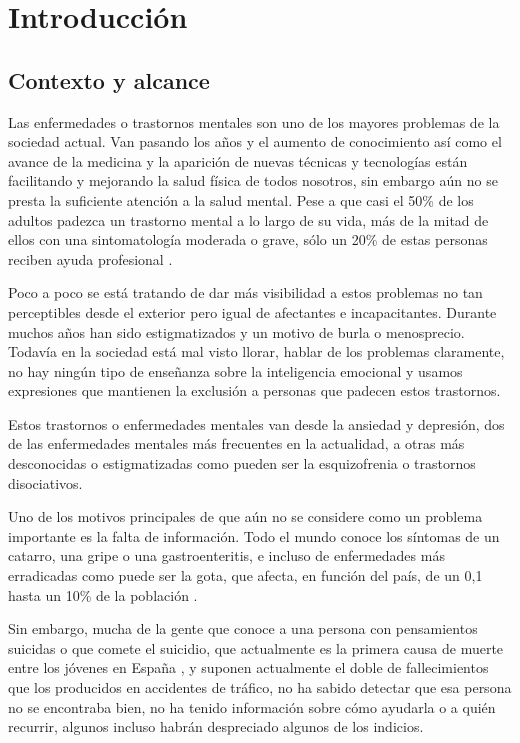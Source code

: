 \documentclass[12pt, a4paper,twoside,titlepage]{book}
\begin{document}
\chapter{Introducción}


\section{Contexto y alcance}

Las enfermedades o trastornos mentales son uno de los mayores problemas de la sociedad actual. Van pasando los años y el aumento de conocimiento así como el avance de la medicina y la aparición de nuevas técnicas y tecnologías están facilitando y mejorando la salud física de todos nosotros, sin embargo aún no se presta la suficiente atención a la salud mental. Pese a que casi el 50\% de los adultos padezca un trastorno mental a lo largo de su vida, más de la mitad de ellos con una sintomatología moderada o grave, sólo un 20\% de estas personas reciben ayuda profesional \cite{articuloIntro1}. 

Poco a poco se está tratando de dar más visibilidad a estos problemas no tan perceptibles desde el exterior pero igual de afectantes e incapacitantes. Durante muchos años han sido estigmatizados y un motivo de burla o menosprecio. Todavía en la sociedad está mal visto llorar, hablar de los problemas claramente, no hay ningún tipo de enseñanza sobre la inteligencia emocional y usamos expresiones que mantienen la exclusión a personas que padecen estos trastornos.  

Estos trastornos o enfermedades mentales van desde la ansiedad y depresión, dos de las enfermedades mentales más frecuentes en la actualidad, a otras más desconocidas o estigmatizadas como pueden ser la esquizofrenia o trastornos disociativos. 

Uno de los motivos principales de que aún no se considere como un problema importante es la falta de información. Todo el mundo conoce los síntomas de un catarro, una gripe o una gastroenteritis, e incluso de enfermedades más erradicadas como puede ser la gota, que afecta, en función del país, de un 0,1 hasta un 10\% de la población \cite{articuloIntro2}. 

Sin embargo, mucha de la gente que conoce a una persona con pensamientos suicidas o que comete el suicidio, que actualmente es la primera causa de muerte entre los jóvenes en España \cite{fundacionSuicidio}, y suponen actualmente el doble de fallecimientos que los producidos en accidentes de tráfico, no ha sabido detectar que esa persona no se encontraba bien, no ha tenido información sobre cómo ayudarla o a quién recurrir, algunos incluso habrán despreciado algunos de los indicios. 
\end{document}
